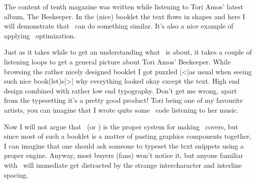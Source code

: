 
%
%


\startbuffer[abstract]
    The content of tenth magazine was written while listening to Tori Amos'
    latest album, The Beekeeper. In the (nice) booklet the text flows in shapes
    and here I will demonstrate that \TEX\ can do something similar. It's also a
    nice example of applying \HZ\ optimization.
\stopbuffer

\startdocument
  [title={Good looking shapes},
   author=Hans Hagen,
   affiliation=PRAGMA ADE,
   date=March 2005,
   number=10 \MKIV]

Just as it takes while to get an understanding what \TEX\ is about, it takes a
couple of listening loops to get a general picture about Tori Amos' Beekeeper.
While browsing the rather nicely designed booklet I got puzzled |<|as usual when
seeing such nice book(let)s|>| why everything looked okay except the text. High
end design combined with rather low end typography. Don't get me wrong, apart
from the typesetting it's a pretty good product! Tori being one of my favourite
artists, you can imagine that I wrote quite some \CONTEXT\ code listening to her
music.

Now I will not argue that \TEX\ (or \CONTEXT) is the proper system for making
\CD\ covers, but since most of such a booklet is a matter of pasting graphics
components together, I can imagine that one should ask someone to typeset the
text snippets using a proper engine. Anyway, most buyers (fans) won't notice it,
but anyone familiar with \TEX\ will immediate get distracted by the strange
intercharacter and interline spacing.

